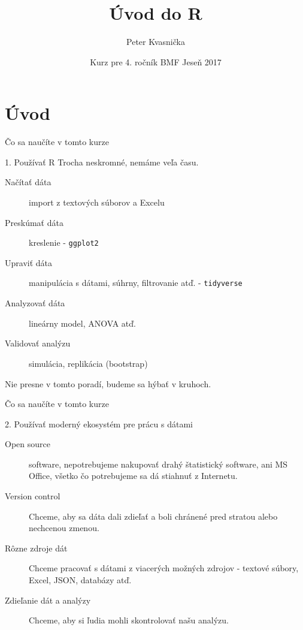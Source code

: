 \documentclass[9pt]{beamer}
\author{Peter Kvasnička}
\title{Úvod do R}
\institute{Univerzita Karlova, Praha}
\date{Kurz pre 4. ročník BMF \newline Jeseň 2017}
\begin{document}
\begin{frame}
\titlepage
\end{frame}

\section{Úvod}
\begin{frame}{Čo sa naučíte v tomto kurze}
	\begin{block}{1. Používať R}
		Trocha neskromné, nemáme veľa času.
		\begin{description}
			\item[Načítať dáta] import z textových súborov a Excelu
			\item[Preskúmať dáta] kreslenie - \texttt{ggplot2}
			\item[Upraviť dáta] manipulácia s dátami, súhrny, filtrovanie atď. - \texttt{tidyverse}
			\item[Analyzovať dáta] lineárny model, ANOVA atď.
			\item[Validovať analýzu] simulácia, replikácia (bootstrap)
		\end{description}
		Nie presne v tomto poradí, budeme sa hýbať v kruhoch.
	\end{block}
\end{frame}

\begin{frame}{Čo sa naučíte v tomto kurze}
	\begin{block}{2. Používať moderný ekosystém pre prácu s dátami}
		\begin{description}
			\item[Open source] software, nepotrebujeme nakupovať drahý štatistický software, ani MS Office, všetko čo potrebujeme sa dá stiahnuť z Internetu.
			\item[Version control] Chceme, aby sa dáta dali zdieľať a boli chránené pred stratou alebo nechcenou zmenou.
			\item[Rôzne zdroje dát] Chceme pracovať s dátami z viacerých možných zdrojov - textové súbory, Excel, JSON, databázy atď.
			\item[Zdieľanie dát a analýzy] Chceme, aby si ľudia mohli skontrolovať našu analýzu.
		\end{description}
	\end{block}
\end{frame}


\end{document}
